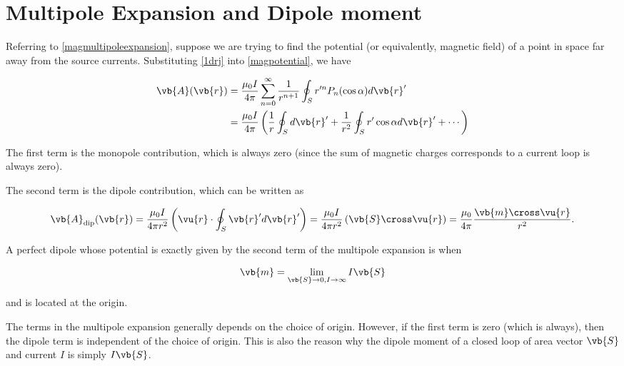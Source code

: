 \documentclass[english,a4paper,12pt]{report}
\begin{document}
\section{Multipole Expansion and Dipole moment}

Referring to \cref{magmultipoleexpansion}, suppose we are trying to find the potential (or equivalently, magnetic field) of a point in space far away from the source currents. Substituting \cref{1drj} into \cref{magpotential}, we have 


\begin{equation}
    \begin{aligned} 
    \vb{A} (\vb{r} ) &= \frac{\mu_0I}{4\pi}  \sum_{n=0}^{\infty} \frac{1}{r^{n+1} } \oint_{S} r'^{n} P_{n}(\cos \alpha )d\vb{r} ' \\
    &= \frac{\mu_0I}{4\pi}  \left( \frac{1}{r} \oint_{S}  d\vb{r}' + \frac{1}{r^2}\oint_{S}  r'\cos \alpha d\vb{r}' + \cdots  \right) 
    \end{aligned} 
\end{equation}

The first term is the monopole contribution, which is always zero (since the sum of magnetic charges corresponds to a current loop is always zero).

The second term is the dipole contribution, which can be written as 

\begin{equation}
    \vb{A} _{\text{dip} } (\vb{r} ) = \frac{\mu_0I}{4\pi r^2}  \left( \vu{r}  \cdot \oint_{S} \vb{r} ' d\vb{r}'  \right) = \frac{\mu_0I}{4\pi r^2} \left( \vb{S} \cross \vu{r} \right) = \frac{\mu_0}{4\pi} \frac{\vb{m} \cross  \vu{r} }{r^2 }.    
\end{equation}

A perfect dipole whose potential is exactly given by the second term of the multipole expansion is when 

\begin{equation}
    \vb{m} = \lim_{\vb{S}  \to 0, I \to \infty} I\vb{S}  
\end{equation}

and is located at the origin. 

The terms in the multipole expansion generally depends on the choice of origin. However, if the first term is zero (which is always), then the dipole term is independent of the choice of origin. This is also the reason why the dipole moment of a closed loop of area vector \(\vb{S} \) and current \(I\) is simply \(I\vb{S} \).    
\end{document}
